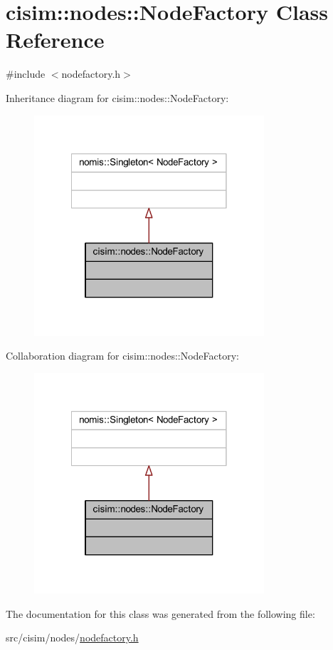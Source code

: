 \hypertarget{classcisim_1_1nodes_1_1_node_factory}{}\section{cisim\+:\+:nodes\+:\+:Node\+Factory Class Reference}
\label{classcisim_1_1nodes_1_1_node_factory}


{\ttfamily \#include $<$nodefactory.\+h$>$}



Inheritance diagram for cisim\+:\+:nodes\+:\+:Node\+Factory\+:
\nopagebreak
\begin{figure}[H]
\begin{center}
\leavevmode
\includegraphics[width=242pt]{classcisim_1_1nodes_1_1_node_factory__inherit__graph}
\end{center}
\end{figure}


Collaboration diagram for cisim\+:\+:nodes\+:\+:Node\+Factory\+:
\nopagebreak
\begin{figure}[H]
\begin{center}
\leavevmode
\includegraphics[width=242pt]{classcisim_1_1nodes_1_1_node_factory__coll__graph}
\end{center}
\end{figure}


The documentation for this class was generated from the following file\+:\begin{DoxyCompactItemize}
\item 
src/cisim/nodes/\hyperlink{nodefactory_8h}{nodefactory.\+h}\end{DoxyCompactItemize}
